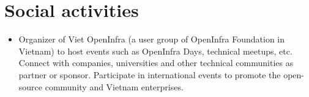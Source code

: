 \documentclass[letterpaper,11pt]{article}
\newcommand{\resumeItemNornal}[1]{
  \item\small{
    {#1 \vspace{-2pt}}
  }
}
\newcommand{\resumeSubItemNormal}[1]{\resumeItemNornal{#1}\vspace{-4pt}}
\newcommand{\resumeSubHeadingListStart}{\begin{itemize}[leftmargin=*]}
\newcommand{\resumeSubHeadingListEnd}{\end{itemize}}
\begin{document}


\section{Social activities}
  \resumeSubHeadingListStart
    \resumeSubItemNormal
      {Organizer of Viet OpenInfra (a user group of OpenInfra Foundation in Vietnam) to host events such as OpenInfra Days, technical meetups, etc. Connect with companies, universities and other technical communities as partner or sponsor. Participate in international events to promote the open-source community and Vietnam enterprises.}

  \resumeSubHeadingListEnd



\end{document}
